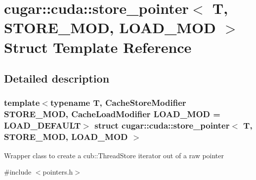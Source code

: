 \hypertarget{structcugar_1_1cuda_1_1store__pointer}{}\section{cugar\+:\+:cuda\+:\+:store\+\_\+pointer$<$ T, S\+T\+O\+R\+E\+\_\+\+M\+OD, L\+O\+A\+D\+\_\+\+M\+OD $>$ Struct Template Reference}
\label{structcugar_1_1cuda_1_1store__pointer}


\subsection{Detailed description}
\subsubsection*{template$<$typename T, Cache\+Store\+Modifier S\+T\+O\+R\+E\+\_\+\+M\+OD, Cache\+Load\+Modifier L\+O\+A\+D\+\_\+\+M\+OD = L\+O\+A\+D\+\_\+\+D\+E\+F\+A\+U\+LT$>$\newline
struct cugar\+::cuda\+::store\+\_\+pointer$<$ T, S\+T\+O\+R\+E\+\_\+\+M\+O\+D, L\+O\+A\+D\+\_\+\+M\+O\+D $>$}

Wrapper class to create a cub\+::\+Thread\+Store iterator out of a raw pointer 

{\ttfamily \#include $<$pointers.\+h$>$}

